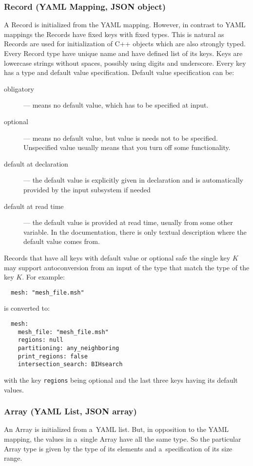 \subsubsection{Record (YAML Mapping, JSON object)}
A Record is initialized from the YAML mapping. However, in contrast to YAML mappings 
the Records have fixed keys with fixed types. 
This is natural as Records are used for initialization of C++ objects which 
are also strongly typed. Every Record type have unique name and have defined list of its keys.
Keys are lowercase strings without spaces, possibly using digits and underscore. Every key has
a type and default value specification. Default value specification can be:
\begin{description} 
 \item[obligatory] --- means no default value, which has to be specified at input. 
 \item[optional] --- means no default value, but value is needs not to be specified. Unspecified value usually means that you turn off some functionality.
 \item[default at declaration] --- the default value is explicitly given in declaration and is automatically provided by the input subsystem if needed
 \item[default at read time] --- the default value is provided at read time, usually from some other variable. In the documentation, 
 there is only textual description where the default value comes from.
\end{description}

Records that have all keys with default value or optional safe the single key $K$ may support autoconversion from an input of the type that match 
the type of the key $K$. For example:
\begin{verbatim}
  mesh: "mesh_file.msh"
\end{verbatim}
is converted to:
\begin{verbatim}
  mesh:
    mesh_file: "mesh_file.msh"
    regions: null
    partitioning: any_neighboring
    print_regions: false
    intersection_search: BIHsearch
\end{verbatim}
with the key \verb'regions' being optional and the last three keys having its default values. 


\subsubsection{Array (YAML List, JSON array)}
An Array is initialized from a~YAML list. But, in opposition to the YAML mapping, the values in a~single Array 
have all the same type. So the particular Array type is given by the type of its elements and a~specification of its size range.

